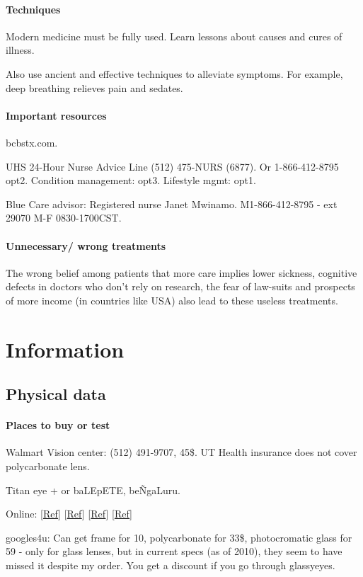 \documentclass[oneside, article]{memoir}
\begin{document}
\subsection{Techniques}
Modern medicine must be fully used. Learn lessons about causes and cures of illness.

Also use ancient and effective techniques to alleviate symptoms. For example, deep breathing relieves pain and sedates.

\subsection{Important resources}
bcbstx.com.

UHS 24-Hour Nurse Advice Line (512) 475-NURS (6877). Or 1-866-412-8795 opt2. Condition management: opt3. Lifestyle mgmt: opt1.

Blue Care advisor: Registered nurse Janet Mwinamo. M1-866-412-8795 - ext 29070 M-F 0830-1700CST.

\subsection{Unnecessary/ wrong treatments}
The wrong belief among patients that more care implies lower sickness, cognitive defects in doctors who don't rely on research, the fear of law-suits and prospects of more income (in countries like USA) also lead to these useless treatments.


\part{Information}
\chapter{Physical data}
\subsection{Places to buy or test}
Walmart Vision center: (512) 491-9707, 45\$. UT Health insurance does not cover polycarbonate lens.

Titan eye + or baLEpETE, be\~NgaLuru.

Online: [\href{http://www.allaboutvision.com/buysmart/eyeglasses.htm}{Ref}] [\href{http://www.43folders.com/2007/11/29/adventures-40-eyeglasses}{Ref}] [\href{http://glassyeyes.blogspot.com/}{Ref}]
[\href{http://www.bettervisionbetterprices.com/giveaway.html}{Ref}]

googles4u: Can get frame for 10, polycarbonate for 33\$, photocromatic glass for 59 - only for glass lenses, but in current specs (as of 2010), they seem to have missed it despite my order. You get a discount if you go through glassyeyes.
\end{document}
